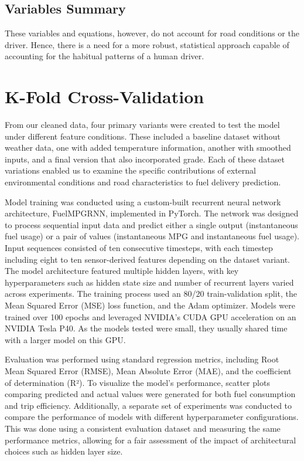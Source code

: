 \documentclass[letterpaper]{article}
\begin{document}
\subsection*{Variables Summary}

These variables and equations, however, do not account for road conditions 
or the driver. Hence, there is a need for a more robust, statistical 
approach capable of accounting for the habitual patterns of a human driver.

\section*{K-Fold Cross-Validation}

From our cleaned data, four primary variants were created to test the model 
under different feature conditions. These included a baseline dataset 
without weather data, one with added temperature information, another with 
smoothed inputs, and a final version that also incorporated grade. Each of 
these dataset variations enabled us to examine the specific contributions 
of external environmental conditions and road characteristics to fuel 
delivery prediction.

Model training was conducted using a custom-built recurrent neural network 
architecture, FuelMPGRNN, implemented in PyTorch. The network was designed 
to process sequential input data and predict either a single output 
(instantaneous fuel usage) or a pair of values (instantaneous MPG and 
instantaneous fuel usage). Input sequences consisted of ten consecutive 
timesteps, with each timestep including eight to ten sensor-derived 
features depending on the dataset variant. The model architecture featured 
multiple hidden layers, with key hyperparameters such as hidden state size 
and number of recurrent layers varied across experiments. The training 
process used an 80/20 train-validation split, the Mean Squared Error 
(MSE) loss function, and the Adam optimizer. Models were trained over 100 
epochs and leveraged NVIDIA's CUDA GPU acceleration on an NVIDIA Tesla P40. 
As the models tested were small, they usually shared time with a larger 
model on this GPU.

Evaluation was performed using standard regression metrics, including Root 
Mean Squared Error (RMSE), Mean Absolute Error (MAE), and the coefficient 
of determination (R²). To visualize the model's performance, scatter plots 
comparing predicted and actual values were generated for both fuel 
consumption and trip efficiency. Additionally, a separate set of 
experiments was conducted to compare the performance of models with 
different hyperparameter configurations. This was done using a consistent 
evaluation dataset and measuring the same performance metrics, allowing 
for a fair assessment of the impact of architectural choices such as 
hidden layer size.
\end{document}
